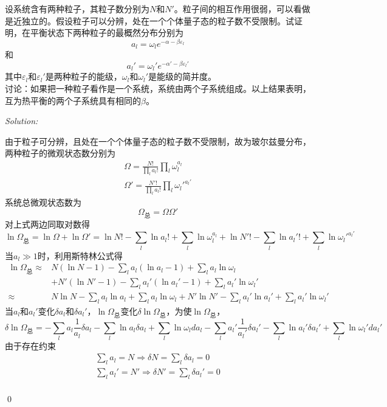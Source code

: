 \documentclass[12pt,a4paper]{article}
\newenvironment{problem}[2][Problem]{\begin{trivlist}
\item[\hskip \labelsep {\bfseries #1}\hskip \labelsep {\bfseries #2.}]}{\end{trivlist}}
\newenvironment{sol}
    {\emph{Solution:}
    }
    {
    \qed
    }
\begin{document}
\begin{problem}{6.5}
设系统含有两种粒子，其粒子数分别为$N$和$N'$。粒子间的相互作用很弱，可以看做是近独立的。假设粒子可以分辨，处在一个个体量子态的粒子数不受限制。试证明，在平衡状态下两种粒子的最概然分布分别为
\[
a_l=\omega_le^{-\alpha-\beta\varepsilon_l}
\]
和
\[
a_l'=\omega_l'e^{-\alpha'-\beta\varepsilon_l'}
\]
其中$\varepsilon_l$和$\varepsilon_l'$是两种粒子的能级，$\omega_l$和$\omega_l'$是能级的简并度。\\
讨论：如果把一种粒子看作是一个系统，系统由两个子系统组成。以上结果表明，互为热平衡的两个子系统具有相同的$\beta$。
\end{problem}
\begin{sol}
由于粒子可分辨，且处在一个个体量子态的粒子数不受限制，故为玻尔兹曼分布，两种粒子的微观状态数分别为
\begin{gather}
\Omega=\frac{N!}{\prod_la_l!}\prod_l\omega_l^{a_l}\\
\Omega'=\frac{N'!}{\prod_la_l!}\prod_l\omega_l'^{a_l'}
\end{gather}
系统总微观状态数为
\begin{equation}
\Omega_{\text{总}}=\Omega\Omega'
\end{equation}
对上式两边同取对数得
\begin{equation}
\ln\Omega_{\text{总}}=\ln\Omega+\ln\Omega'=\ln N!-\sum_l\ln a_l!+\sum_l\ln\omega_l^{a_l}+\ln N'!-\sum_l\ln a_l'!+\sum_l\ln\omega_l'^{a_l'}
\end{equation}
当$a_l\gg1$时，利用斯特林公式得
\begin{align}
\nonumber\ln\Omega_{\text{总}}\approx&N(\ln N-1)-\sum_la_l(\ln a_l-1)+\sum_la_l\ln\omega_l\\
\nonumber&+N'(\ln N'-1)-\sum_la_l'(\ln a_l'-1)+\sum_la_l'\ln\omega_l'\\
\approx&N\ln N-\sum_la_l\ln a_l+\sum_la_l\ln\omega_l+N'\ln N'-\sum_la_l'\ln a_l'+\sum_la_l'\ln\omega_l'
\end{align}
当$a_l$和$a_l'$变化$\delta a_l$和$\delta a_l'$，$\ln\Omega_{\text{总}}$变化$\delta\ln\Omega_{\text{总}}$，为使$\ln\Omega_{\text{总}}$，
\begin{equation}
\delta\ln\Omega_{\text{总}}=-\sum_la_l\frac{1}{a_l}\delta a_l-\sum_l\ln a_l\delta a_l+\sum_l\ln\omega_lda_l-\sum_la_l'\frac{1}{a_l'}\delta a_l'-\sum_l\ln a_l'\delta a_l'+\sum_l\ln\omega_l'da_l'
\end{equation}
由于存在约束
\begin{gather}
\sum_la_l=N\Longrightarrow\delta N=\sum_l\delta a_l=0\\
\sum_la_l'=N'\Longrightarrow\delta N'=\sum_l\delta a_l'=0\\

\end{gather}
\end{sol}
\end{document}
